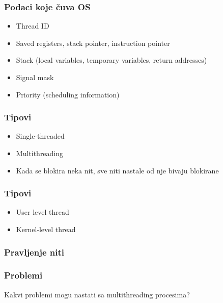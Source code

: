 \documentclass{beamer}
\begin{document}
\begin{frame}
    \frametitle{Podaci koje čuva OS}
    \begin{itemize}
        \item Thread ID \newline
        \item Saved registers, stack pointer, instruction pointer \newline
        \item Stack (local variables, temporary variables, return addresses) \newline
        \item Signal mask \newline
        \item Priority (scheduling information)
    \end{itemize}
\end{frame}

\begin{frame}
    \frametitle{Tipovi}
    \begin{itemize}
        \item Single-threaded \newline
        \item Multithreading \newline
        \item Kada se blokira neka nit, sve niti nastale od nje bivaju blokirane
    \end{itemize}
\end{frame}

\begin{frame}
    \frametitle{Tipovi}
    \begin{itemize}
        \item User level thread \newline
        \item Kernel-level thread
    \end{itemize}

    

\end{frame}

\begin{frame}
    \frametitle{Pravljenje niti}

    

\end{frame}

\begin{frame}
    \frametitle{Problemi}
    \begin{center}
        Kakvi problemi mogu nastati sa multithreading procesima?
    \end{center}
\end{frame}
\end{document}
